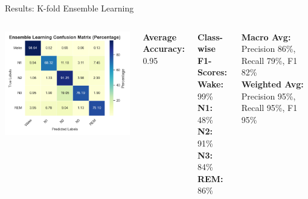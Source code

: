 \begin{frame}{Results: K-fold Ensemble Learning}
	\begin{columns}
		\centering
		\includegraphics[width=\linewidth]{"images/paper_1/Ensemble Learning_percentage_based"}
		
		\scriptsize
		\textbf{Average Accuracy:} 0.95
		
		\vspace{0.3em}
		\textbf{Class-wise F1-Scores:} \\
		\textbf{Wake:} 99\% \\
		\textbf{N1:} 48\% \\
		\textbf{N2:} 91\% \\
		\textbf{N3:} 84\% \\
		\textbf{REM:} 86\%
		
		\vspace{0.3em}
		\textbf{Macro Avg:} Precision 86\%, Recall 79\%, F1 82\% \\
		\textbf{Weighted Avg:} Precision 95\%, Recall 95\%, F1 95\%
	\end{columns}
\end{frame}


